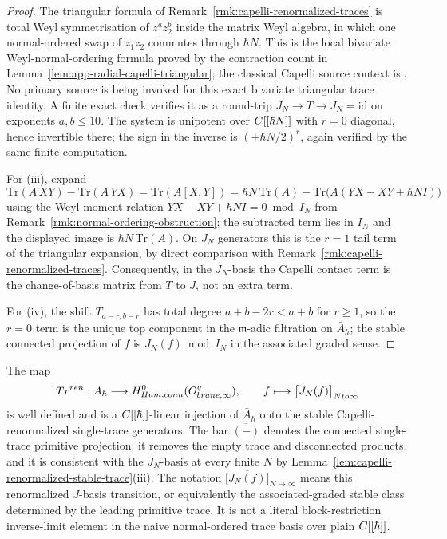 \documentclass[11pt]{memoir}
\begin{document}
\begin{proof}
  The triangular formula of
  Remark~\ref{rmk:capelli-renormalized-traces} is total Weyl symmetrisation
  of $z_1^az_2^b$ inside the matrix Weyl algebra, in which one
  normal-ordered swap of $z_1z_2$ commutes through $\hbar N$. This is
  the local bivariate Weyl-normal-ordering formula proved by the
  contraction count in
  Lemma~\ref{lem:app-radial-capelli-triangular}; the classical
  Capelli source context is \cites{capelli,howe-capelli}.  No primary
  source is being invoked for this exact bivariate triangular trace
  identity.  A finite exact check verifies it as a round-trip
  \(J_N\to T\to J_N=\mathrm{id}\) on exponents \(a,b\leq10\).
  The system is unipotent over $C[[\hbar N]]$ with $r=0$ diagonal, hence
  invertible there; the sign in the inverse is $(+\hbar N/2)^r$, again
  verified by the same finite computation.

  For (iii), expand
  $$\mathrm{Tr}(A\,XY)-\mathrm{Tr}(A\,YX)
    =\mathrm{Tr}(A[X,Y])
    =\hbar N\,\mathrm{Tr}(A)
      -\mathrm{Tr}\bigl(A(YX-XY+\hbar N I)\bigr)$$
  using the Weyl moment relation $YX-XY+\hbar N I=0\bmod I_N$ from
  Remark~\ref{rmk:normal-ordering-obstruction}; the subtracted term lies
  in $I_N$ and the displayed image is $\hbar N\,\mathrm{Tr}(A)$. On $J_N$
  generators this is the $r=1$ tail term of the triangular expansion, by
  direct comparison with Remark~\ref{rmk:capelli-renormalized-traces}.
  Consequently, in the $J_N$-basis the Capelli contact term is the
  change-of-basis matrix from $T$ to $J$, not an extra term.

  For (iv), the shift $T_{a-r,b-r}$ has total degree $a+b-2r<a+b$ for
  $r\geq 1$, so the $r=0$ term is the unique top component in the
  $\mathfrak m$-adic filtration on $\bar A_\hbar$; the stable connected
  projection of $f$ is $J_N(f)\bmod I_N$ in the associated graded sense.
\end{proof}

\begin{cor}\label{cor:renormalized-stable-connected-map}
  The map
  $$Tr^{ren}:A_\hbar\longrightarrow
    H^0_{Ham,conn}(O^{q}_{brane,\infty}),
    \qquad f\longmapsto
      \bigl[J_N(f)\bigr]_{Nto\infty}$$
  is well defined and is a $C[[\hbar]]$-linear injection of $\bar A_\hbar$
  onto the stable Capelli-renormalized single-trace generators. The bar
  $\overline{(-)}$ denotes the connected single-trace primitive projection:
  it removes the empty trace and disconnected products, and it is
  consistent with the $J_N$-basis at every finite $N$ by
  Lemma~\ref{lem:capelli-renormalized-stable-trace}(iii).  The notation
  \(\bigl[\overline{J_N(f)}\bigr]_{N\to\infty}\) means this
  renormalized \(J\)-basis transition, or equivalently the associated-graded
  stable class determined by the leading primitive trace.  It is not a
  literal block-restriction inverse-limit element in the naive
  normal-ordered trace basis over plain \(C[[\hbar]]\).
\end{cor}
\end{document}
